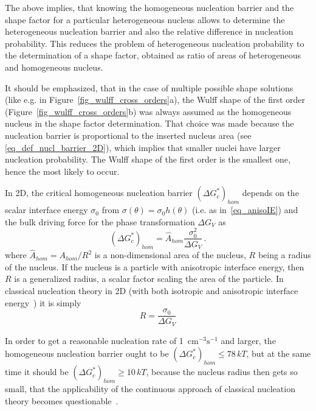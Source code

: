 	The above implies, that knowing the homogeneous nucleation barrier and the shape factor for a particular heterogeneous nucleus allows to determine the heterogeneous nucleation barrier and also the relative difference in nucleation probability. This reduces the problem of heterogeneous nucleation probability to the determination of a shape factor, obtained as ratio of areas of heterogeneous and homogeneous nucleus. 
	
	It should be emphasized, that in the case of multiple possible shape solutions (like e.g. in Figure~\ref{fig_wulff_cross_orders}a), the Wulff shape of the first order (Figure~\ref{fig_wulff_cross_orders}b) was always assumed as the homogeneous nucleus in the shape factor determination. That choice was made because the nucleation barrier is proportional to the inserted nucleus area (see \eqref{eq_def_nucl_barrier_2D}), which implies that smaller nuclei have larger nucleation probability. The Wulff shape of the first order is the smallest one, hence the most likely to occur.
	
	In 2D, the critical homogeneous nucleation barrier $(\Delta G_c^*)_{hom}$ depends on the scalar interface energy $\sigma_0$ from $\sigma(\theta)=\sigma_0 h(\theta)$ (i.e. as in~\eqref{eq_anisoIE}) and the bulk driving force for the phase transformation $\Delta G_V$ as
	\begin{equation} \label{eq_def_nucl_barrier_2D}
		(\Delta G_c^*)_{hom} = \hat{A}_{hom}\frac{\sigma_0^2}{\Delta G_V}\,.
	\end{equation}
	where $\hat{A}_{hom}=A_{hom}/R^2$ is a non-dimensional area of the nucleus, $R$ being a radius of the nucleus. If the nucleus is a particle with anisotropic interface energy, then $R$ is a generalized radius, a scalar factor scaling the area of the particle. In classical nucleation theory in 2D (with both isotropic and anisotropic interface energy~\cite{Mariaux2011}) it is simply
	\begin{equation}
		R = \frac{\sigma_0}{\Delta G_V}
	\end{equation}
	
	In order to get a reasonable nucleation rate of 1~$\mathrm{cm^{-3}s^{-1}}$ and larger, the homogeneous nucleation barrier ought to be $(\Delta G_c^*)_{hom}\leq78\,kT$, but at the same time it should be $(\Delta G_c^*)_{hom}\geq10\,kT$, because the nucleus radius then gets so small, that the applicability of the continuous approach of classical nucleation theory becomes questionable~\cite[pp.195]{Porter2009}. 
	
